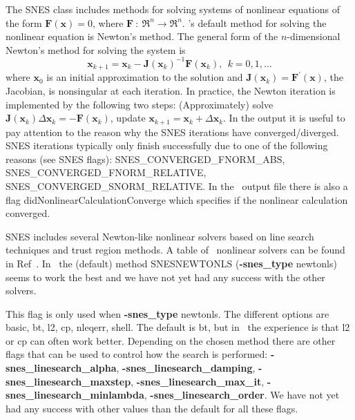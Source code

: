 The SNES class includes methods for solving systems of nonlinear equations of the form $\bm{F} \left(\bm{x}\right) = 0$, 
where $\bm{F}~:~\Re^n \rightarrow \Re^n$. 
\PETSc's default method for solving the nonlinear equation is Newton's method. The general
form of the $n$-dimensional Newton's method for solving the system is 
\[
\bm{x}_{k + 1} = \bm{x}_{k} - \bm{J} \left(\bm{x}_{k}\right)^{-1} \bm{F} \left(\bm{x}_{k}\right),~~k = 0, 1, \ldots
\]
where $\bm{x}_{0}$ is an initial approximation to the solution and $\bm{J} \left(\bm{x}_{k}\right) = \bm{F}^\prime \left(\bm{x}\right)$, the Jacobian, is nonsingular at each iteration. In practice, the Newton iteration is implemented by the following two
steps: (Approximately) solve $\bm{J} \left(\bm{x}_{k}\right) \Delta \bm{x}_{k} = - \bm{F} \left(\bm{x}_{k}\right)$,  update $\bm{x}_{k + 1} = \bm{x}_{k} + \Delta \bm{x}_{k}$. 
In the output it is useful to pay attention to the reason why the SNES iterations have converged/diverged. 
SNES iterations typically only finish successfully due to one of the following reasons (see SNES flags): {\ttfamily SNES\_CONVERGED\_FNORM\_ABS}, {\ttfamily SNES\_CONVERGED\_FNORM\_RELATIVE},\\ {\ttfamily SNES\_CONVERGED\_SNORM\_RELATIVE}. 
In the \sfincs~output file  there is also a flag {\ttfamily didNonlinearCalculationConverge} which specifies if the nonlinear calculation converged.\\

\myhrule

{SNES includes several Newton-like nonlinear solvers based on line search techniques and trust region methods. A table of \PETSc~nonlinear solvers can be found in Ref~\cite{PETSc2017}. In \sfincs~the (default) method SNESNEWTONLS ({\ttfamily \bfseries -snes\_type} {\normalfont \ttfamily newtonls}) seems to work the best and we have not yet had any success with the other solvers. 
}

\myhrule

{This flag is only used when {\ttfamily \bfseries -snes\_type} {\normalfont \ttfamily newtonls}. The different options are {\normalfont \ttfamily basic}, {\normalfont \ttfamily bt}, {\normalfont \ttfamily l2}, {\normalfont \ttfamily cp}, {\normalfont \ttfamily nleqerr}, {\normalfont \ttfamily shell}. 
The default is {\normalfont \ttfamily bt}, but in \sfincs~the experience is that {\normalfont \ttfamily l2} or {\normalfont \ttfamily cp} can often work better. 
Depending on the chosen method there are other flags that can be used to control how the search is performed: {\ttfamily \bfseries -snes\_linesearch\_alpha}, {\ttfamily \bfseries -snes\_linesearch\_damping}, {\ttfamily \bfseries -snes\_linesearch\_maxstep}, {\ttfamily \bfseries -snes\_linesearch\_max\_it}, {\ttfamily \bfseries -snes\_linesearch\_minlambda}, {\ttfamily \bfseries -snes\_linesearch\_order}. We have not yet had any success with other values than the default for all these flags. 
}

